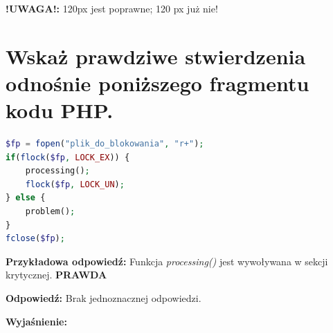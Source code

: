 \textbf{!UWAGA!: }120px jest poprawne; 120 px już nie!


\section{Wskaż prawdziwe stwierdzenia odnośnie poniższego fragmentu kodu PHP.}
\begin{lstlisting}[language=php]
$fp = fopen("plik_do_blokowania", "r+");
if(flock($fp, LOCK_EX)) {
	processing();
	flock($fp, LOCK_UN);
} else {
	problem();
}
fclose($fp);
\end{lstlisting}

\noindent
{\textbf{Przykładowa odpowiedź:}}
Funkcja \textit{processing()} jest wywoływana w sekcji krytycznej.
\textbf{PRAWDA}

\vspace{0.4cm}
\noindent
\textbf{Odpowiedź:}
Brak jednoznacznej odpowiedzi.

\vspace{0.4cm}
\noindent
\textbf{Wyjaśnienie:}

